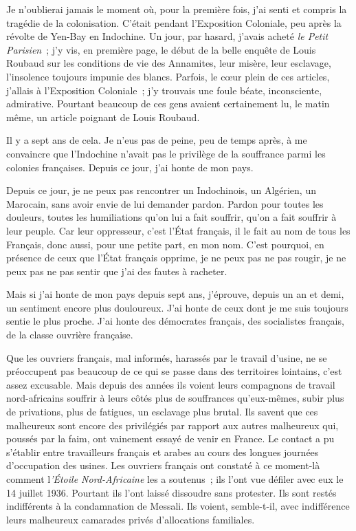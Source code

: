 \documentclass[french,twoside]{book} %
\begin{document}
Je n'oublierai jamais le moment où, pour la première fois, j'ai senti et compris la tragédie de la colonisation. C'était pendant l'Exposition Coloniale, peu après la révolte de Yen-Bay en Indochine. Un jour, par hasard, j'avais acheté {\itshape le Petit Parisien} ; j'y vis, en première page, le début de la belle enquête de Louis Roubaud sur les conditions de vie des Annamites, leur misère, leur esclavage, l'insolence toujours impunie des blancs. Parfois, le cœur plein de ces articles, j'allais à l'Exposition Coloniale ; j'y trouvais une foule béate, inconsciente, admirative. Pourtant beaucoup de ces gens avaient certainement lu, le matin même, un article poignant de Louis Roubaud.\par
Il y a sept ans de cela. Je n'eus pas de peine, peu de temps après, à me convaincre que l'Indochine n'avait pas le privilège de la souffrance parmi les colonies françaises. Depuis ce jour, j'ai honte de mon pays.\par
Depuis ce jour, je ne peux pas rencontrer un Indochinois, un Algérien, un Marocain, sans avoir envie de lui demander pardon. Pardon pour toutes les douleurs, toutes les humiliations qu'on lui a fait souffrir, qu'on a fait souffrir à leur peuple. Car leur oppresseur, c'est l'État français, il le fait au nom de tous les Français, donc aussi, pour une petite part, en mon nom. C'est pourquoi, en présence de ceux que l'État français opprime, je ne peux pas ne pas rougir, je ne peux pas ne pas sentir que j'ai des fautes à racheter.\par
Mais si j'ai honte de mon pays depuis sept ans, j'éprouve, depuis un an et demi, un sentiment encore plus douloureux. J'ai honte de ceux dont je me suis toujours sentie le plus proche. J'ai honte des démocrates français, des socia­listes français, de la classe ouvrière française.\par
Que les ouvriers français, mal informés, harassés par le travail d'usine, ne se préoccupent pas beaucoup de ce qui se passe dans des territoires lointains, c'est assez excusable. Mais depuis des années ils voient leurs compagnons de travail nord-africains souffrir à leurs côtés plus de souffrances qu'eux-mêmes, subir plus de privations, plus de fatigues, un esclavage plus brutal. Ils savent que ces malheureux sont encore des privilégiés par rapport aux autres malheureux qui, poussés par la faim, ont vainement essayé de venir en France. Le contact a pu s'établir entre travailleurs français et arabes au cours des longues journées d'occupation des usines. Les ouvriers français ont constaté à ce moment-là comment l{\itshape 'Étoile Nord-Africaine} les a soutenus ; ils l'ont vue défiler avec eux le 14 juillet 1936. Pourtant ils l'ont laissé dissoudre sans protester. Ils sont restés indifférents à la condamnation de Messali. Ils voient, semble-t-il, avec indifférence leurs malheureux camarades privés d'allocations familiales.\par
\end{document}
